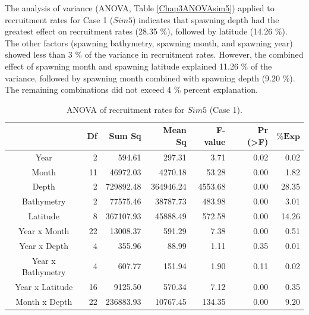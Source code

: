 The analysis of variance (ANOVA, Table \ref{Chap3ANOVAsim5}) applied to recruitment rates for Case 1 ($Sim 5$) indicates that spawning depth had the greatest effect on recruitment rates (28.35 \%), followed by latitude (14.26 \%). The other factors (spawning bathymetry, spawning month, and spawning year) showed less than 3 \% of the variance in recruitment rates. However, the combined effect of spawning month and spawning latitude explained 11.26 \% of the variance, followed by spawning month combined with spawning depth (9.20 \%). The remaining combinations did not exceed 4 \% percent explanation.\\

\begin{table}[H]
\centering
\caption{ANOVA of recruitment rates for $Sim 5$ (Case 1).}
\begin{adjustbox}{width=0.9\textwidth}
\small
\begin{tabular}{c|r|r|r|r|r|r}
\toprule
                                  &
	\textbf{Df}                   &
	\textbf{Sum Sq}               &
	\textbf{Mean Sq}              &
	\textbf{F-value}    		   &
	\textbf{Pr (\textgreater{F})} &
	$\mathbf{\% Exp}$      \\
\midrule
Year                  & 2    & 594.61    & 297.31    & 3.71    & 0.02                & 0.02  \\
Month                 & 11   & 46972.03  & 4270.18   & 53.28   & 0.00                & 1.82  \\
Depth                 & 2    & 729892.48 & 364946.24 & 4553.68 & 0.00                & 28.35 \\
Bathymetry            & 2    & 77575.46  & 38787.73  & 483.98  & 0.00                & 3.01  \\
Latitude              & 8    & 367107.93 & 45888.49  & 572.58  & 0.00                & 14.26 \\
Year x Month          & 22   & 13008.37  & 591.29    & 7.38    & 0.00                & 0.51  \\
Year x Depth          & 4    & 355.96    & 88.99     & 1.11    & 0.35                & 0.01  \\
Year x Bathymetry     & 4    & 607.77    & 151.94    & 1.90    & 0.11                & 0.02  \\
Year x Latitude       & 16   & 9125.50   & 570.34    & 7.12    & 0.00                & 0.35  \\
Month x Depth         & 22   & 236883.93 & 10767.45  & 134.35  & 0.00                & 9.20  \\

\end{tabular}
\end{adjustbox}
\end{table}

